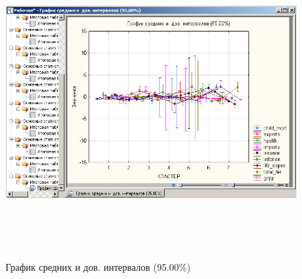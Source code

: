 \begin{figure}[!ph]
  \centering

  \includegraphics[height=12cm]
  {inc/cars_my/var5__3_21.PNG}

  \caption{График средних и дов. интервалов (95.00\%)}
  \label{fig:var5__3_21}
\end{figure}
